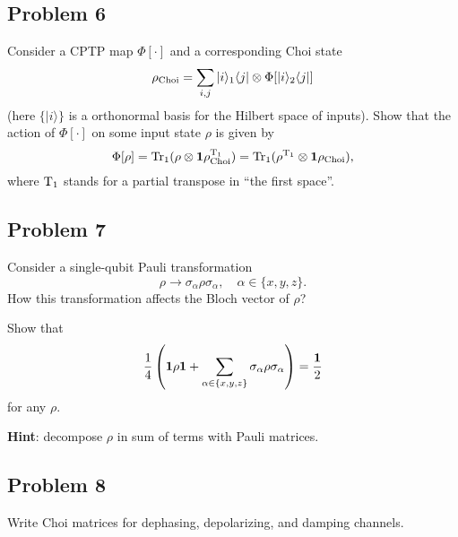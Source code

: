 \documentclass[a4paper,10pt]{article}
\newcommand{\ket}[1]{|#1\rangle}
\newcommand{\bra}[1]{\langle#1|}
\newcommand{\tr}{\ensuremath{{\rm Tr}}}
\begin{document}
\subsection*{Problem 6}
Consider a CPTP map $\Phi[\cdot]$ and a corresponding Choi state
\begin{equation}
	\rho_{\rm Choi} = \sum_{i,j} \ket{i}_{1}\bra{j}\otimes\Phi[\ket{i}_{2}\bra{j}]
\end{equation}
(here $\{\ket{i}\}$ is a orthonormal basis for the Hilbert space of inputs).
Show that the action of $\Phi[\cdot]$ on some input state $\rho$ is given by
\begin{equation}
	\Phi[\rho]=\tr_{1}(\rho\otimes {\bf 1} \rho_{\rm Choi}^{\rm T_{1}})=
	\tr_{1}(\rho^{\rm T_{1}}\otimes {\bf 1} \rho_{\rm Choi}),
\end{equation}
where ${\rm T}_{1}$ stands for a partial transpose in ``the first space''.

\subsection*{Problem 7}
Consider a single-qubit Pauli transformation 
\begin{equation}
	\rho\rightarrow \sigma_{\alpha}\rho\sigma_{\alpha}, \quad \alpha\in\{x,y,z\}.
\end{equation}
How this transformation affects the Bloch vector of $\rho$?

Show that 
\begin{equation}
	\frac{1}{4}\left({\bf 1}\rho{\bf 1}+\sum_{\alpha\in\{x,y,z\}}\sigma_{\alpha}\rho\sigma_{\alpha}\right) = \frac{\bf 1}{2}
\end{equation}
for any $\rho$.

{\bf Hint}: decompose $\rho$ in sum of terms with Pauli matrices.


\subsection*{Problem 8}
Write Choi matrices for dephasing, depolarizing, and damping channels.
\end{document}
